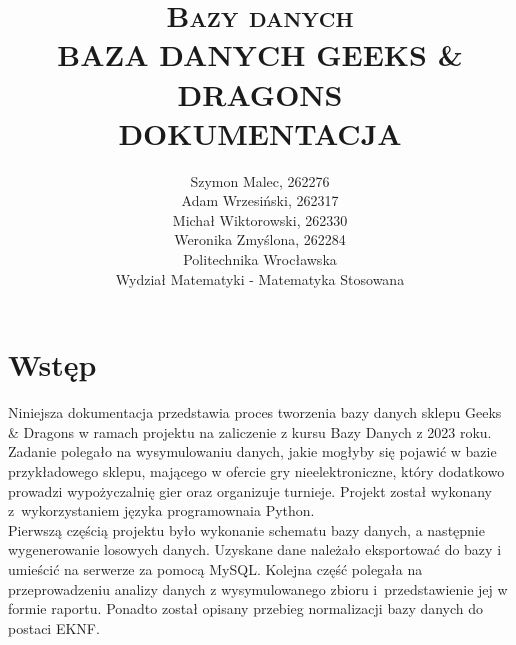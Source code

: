\documentclass{article}
\begin{document}
	\title{ \LARGE \textsc{Bazy danych}
		\\ [5.5cm]
		\huge \textbf{\uppercase{Baza danych Geeks \& Dragons}}
		\\ [0.5cm]
		\large \textbf{\uppercase{Dokumentacja}}
		}
	\date{}
	\maketitle
	\vspace{7.5cm}
	
	\begin{center}
	\author{
		Szymon Malec, 262276 \\
		Adam Wrzesiński, 262317\\
		Michał Wiktorowski, 262330 \\
		Weronika Zmyślona, 262284 \\
		\vspace{0.5cm}
		Politechnika Wrocławska \\
		Wydział Matematyki - Matematyka Stosowana}
	\end{center}
	
	\thispagestyle{empty}
	
	\newpage\thispagestyle{empty}
	\mbox{}
	
	\setcounter {page}{1}
	
	\tableofcontents
	
	\newpage
	\section{Wstęp}
	Niniejsza dokumentacja przedstawia proces tworzenia bazy danych sklepu Geeks \& Dragons w ramach projektu na zaliczenie z kursu Bazy Danych z 2023 roku. Zadanie polegało na wysymulowaniu danych, jakie mogłyby się pojawić w bazie przykładowego sklepu, mającego w ofercie gry nieelektroniczne, który dodatkowo prowadzi wypożyczalnię gier oraz organizuje turnieje. Projekt został wykonany z~wykorzystaniem języka programownaia Python.\\
	
	\noindent Pierwszą częścią projektu było wykonanie schematu bazy danych, a następnie wygenerowanie losowych danych. Uzyskane dane należało eksportować do bazy i umieścić na serwerze za pomocą MySQL. Kolejna część polegała na przeprowadzeniu analizy danych z wysymulowanego zbioru i~przedstawienie jej w formie raportu. Ponadto został opisany przebieg normalizacji bazy danych do postaci EKNF. 
	
\end{document}
